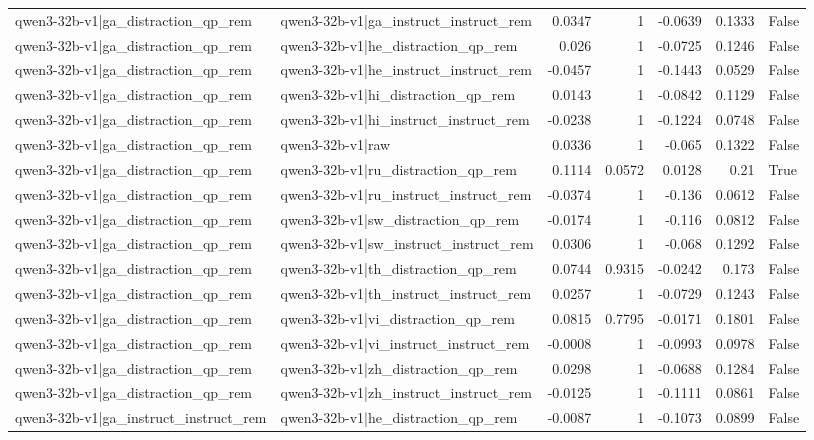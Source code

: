 \begin{table}
\begin{tabular}{l l r r r r l}
qwen3-32b-v1|ga_distraction_qp_rem & qwen3-32b-v1|ga_instruct_instruct_rem & 0.0347 & 1 & -0.0639 & 0.1333 & False \\
qwen3-32b-v1|ga_distraction_qp_rem & qwen3-32b-v1|he_distraction_qp_rem & 0.026 & 1 & -0.0725 & 0.1246 & False \\
qwen3-32b-v1|ga_distraction_qp_rem & qwen3-32b-v1|he_instruct_instruct_rem & -0.0457 & 1 & -0.1443 & 0.0529 & False \\
qwen3-32b-v1|ga_distraction_qp_rem & qwen3-32b-v1|hi_distraction_qp_rem & 0.0143 & 1 & -0.0842 & 0.1129 & False \\
qwen3-32b-v1|ga_distraction_qp_rem & qwen3-32b-v1|hi_instruct_instruct_rem & -0.0238 & 1 & -0.1224 & 0.0748 & False \\
qwen3-32b-v1|ga_distraction_qp_rem & qwen3-32b-v1|raw & 0.0336 & 1 & -0.065 & 0.1322 & False \\
qwen3-32b-v1|ga_distraction_qp_rem & qwen3-32b-v1|ru_distraction_qp_rem & 0.1114 & 0.0572 & 0.0128 & 0.21 & True \\
qwen3-32b-v1|ga_distraction_qp_rem & qwen3-32b-v1|ru_instruct_instruct_rem & -0.0374 & 1 & -0.136 & 0.0612 & False \\
qwen3-32b-v1|ga_distraction_qp_rem & qwen3-32b-v1|sw_distraction_qp_rem & -0.0174 & 1 & -0.116 & 0.0812 & False \\
qwen3-32b-v1|ga_distraction_qp_rem & qwen3-32b-v1|sw_instruct_instruct_rem & 0.0306 & 1 & -0.068 & 0.1292 & False \\
qwen3-32b-v1|ga_distraction_qp_rem & qwen3-32b-v1|th_distraction_qp_rem & 0.0744 & 0.9315 & -0.0242 & 0.173 & False \\
qwen3-32b-v1|ga_distraction_qp_rem & qwen3-32b-v1|th_instruct_instruct_rem & 0.0257 & 1 & -0.0729 & 0.1243 & False \\
qwen3-32b-v1|ga_distraction_qp_rem & qwen3-32b-v1|vi_distraction_qp_rem & 0.0815 & 0.7795 & -0.0171 & 0.1801 & False \\
qwen3-32b-v1|ga_distraction_qp_rem & qwen3-32b-v1|vi_instruct_instruct_rem & -0.0008 & 1 & -0.0993 & 0.0978 & False \\
qwen3-32b-v1|ga_distraction_qp_rem & qwen3-32b-v1|zh_distraction_qp_rem & 0.0298 & 1 & -0.0688 & 0.1284 & False \\
qwen3-32b-v1|ga_distraction_qp_rem & qwen3-32b-v1|zh_instruct_instruct_rem & -0.0125 & 1 & -0.1111 & 0.0861 & False \\
qwen3-32b-v1|ga_instruct_instruct_rem & qwen3-32b-v1|he_distraction_qp_rem & -0.0087 & 1 & -0.1073 & 0.0899 & False \\

\end{tabular}
\end{table}
